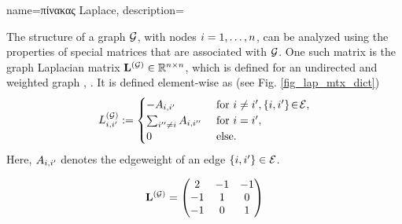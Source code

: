 {name={\foreignlanguage{greek}{πίνακας} Laplace},
	description={The structure of a \gls{graph} $\mathcal{G}$, with 
		nodes $i=1,\ldots,n$, can be analyzed using the properties of 
		special matrices that are associated with $\mathcal{G}$. One such matrix is the 
		\gls{graph} Laplacian matrix ${\bf L}^{(\mathcal{G})} \in \mathbb{R}^{n \times n}$, 
		which is defined for an undirected and weighted \gls{graph} \cite{Luxburg2007}, \cite{Ng2001}. 
		It is defined element-wise as (see Fig. \ref{fig_lap_mtx_dict})
		\begin{equation}
		L^{(\mathcal{G})}_{i,i'} := \begin{cases} - A_{i,i'} & \mbox{ for } i\neq i', \{i,i'\}\!\in\!\mathcal{E}, \\ 
			\sum_{i'' \neq i} A_{i,i''} & \mbox{ for } i = i', \\ 
							0 & \mbox{ else.} \end{cases}
	 	\end{equation}
  		Here, $A_{i,i'}$ denotes the \gls{edgeweight} of an edge $\{i,i'\} \in \mathcal{E}$. 
 	 	\begin{figure}[H]
  		\begin{center}
    		\begin{minipage}{0.45\textwidth}
	 			 	\end{minipage} 
	 			 	\hspace*{-15mm}
 		 		\begin{minipage}{0.45\textwidth}
	 			 	 \begin{equation} 
	 				 		 \LapMat{\graph} = \begin{pmatrix} 2 & -1& -1 \\ -1& 1 & 0 \\  -1 & 0 & 1 \end{pmatrix}  
	 				 		 \nonumber

\end{equation}
\end{minipage}
\end{center}
\end{figure}}}
